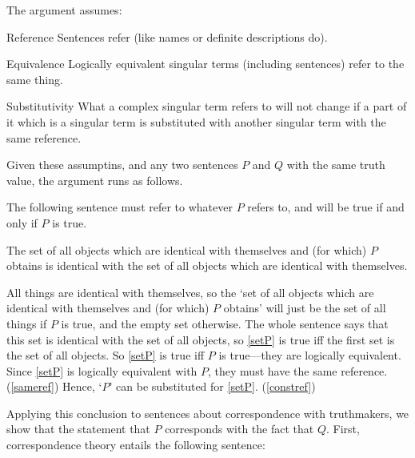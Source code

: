 The argument assumes:
\parencite[753]{Davidson_1969}

	\begin{principle}{Reference} \label{srefer}
	Sentences refer (like names or definite descriptions do).
	\end{principle}

	\begin{principle}{Equivalence} \label{sameref}
	Logically equivalent singular terms (including sentences) refer to the same thing.
	\end{principle}

	\begin{principle}{Substitutivity} \label{constref}
	What a complex singular term refers to will not change if a part of it which is a singular term is substituted with another singular term with the same reference.
	\end{principle}


Given these assumptins, and any two sentences $P$ and $Q$ with the same truth value, the argument runs as follows.

The following sentence must refer to whatever $P$ refers to, and will be true if and only if $P$ is true.

	\begin{example} \label{setP}
	The set of all objects which are identical with themselves and (for which) $P$ obtains is identical with the set of all objects which are identical with themselves.
	\end{example}

All things are identical with themselves, so the `set of all objects which are identical with themselves and (for which) $P$ obtains' will just be the set of all things if $P$ is true, and the empty set otherwise.
The whole sentence says that this set is identical with the set of all objects, so \ref{setP} is true iff the first set is the set of all objects.
So \ref{setP} is true iff $P$ is true---they are logically equivalent.
Since \ref{setP} is logically equivalent with $P$, they must have the same reference.
(\ref{sameref})
Hence, `$P$' can be substituted for \ref{setP}.
(\ref{constref})

Applying this conclusion to sentences about correspondence with truthmakers, we show that the statement that $P$ corresponds with the fact that $Q$.
First, correspondence theory entails the following sentence:


